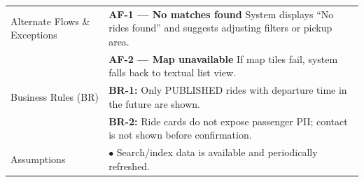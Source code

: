 \begin{longtable}{|>{\raggedright\arraybackslash}p{4cm}|>{\raggedright\arraybackslash}p{11cm}|}
\hline
Alternate Flows \& Exceptions & \textbf{AF-1 — No matches found} \newline System displays ``No rides found'' and suggests adjusting filters or pickup area. \\
& \textbf{AF-2 — Map unavailable} \newline If map tiles fail, system falls back to textual list view. \\
\hline
Business Rules (BR) & \textbf{BR-1:} Only PUBLISHED rides with departure time in the future are shown. \\
& \textbf{BR-2:} Ride cards do not expose passenger PII; contact is not shown before confirmation. \\
\hline
Assumptions & $\bullet$ Search/index data is available and periodically refreshed. \\
\end{longtable}

